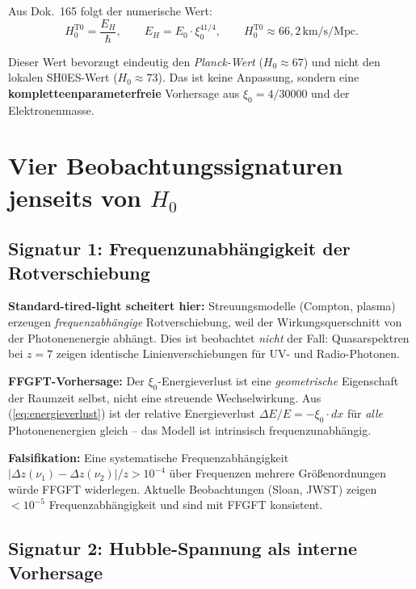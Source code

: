 Aus Dok.~165 folgt der numerische Wert:
\begin{equation}
  H_0^{\text{T0}}
  = \frac{E_H}{\hbar},
  \qquad
  E_H = E_0 \cdot \xi_0^{41/4},
  \qquad
  H_0^{\text{T0}} \approx 66{,}2\,\text{km/s/Mpc}.
\end{equation}

Dieser Wert bevorzugt eindeutig den \emph{Planck-Wert} ($H_0 \approx
67$) und nicht den lokalen SH0ES-Wert ($H_0 \approx 73$). Das ist
keine Anpassung, sondern eine \textbf{kompletteenparameterfreie}
Vorhersage aus $\xi_0 = 4/30000$ und der Elektronenmasse.

\section{\texorpdfstring{Vier Beobachtungssignaturen jenseits von $H_0$}{Vier Beobachtungssignaturen jenseits von H_0}}

\subsection{Signatur 1: Frequenzunabhängigkeit der Rotverschiebung}

\textbf{Standard-tired-light scheitert hier:} Streuungsmodelle
(Compton, plasma) erzeugen \emph{frequenzabhängige} Rotverschiebung,
weil der Wirkungsquerschnitt von der Photonenenergie abhängt. Dies ist
beobachtet \emph{nicht} der Fall: Quasarspektren bei $z = 7$ zeigen
identische Linienverschiebungen für UV- und Radio-Photonen.

\textbf{FFGFT-Vorhersage:} Der $\xi_0$-Energieverlust ist eine
\emph{geometrische} Eigenschaft der Raumzeit selbst, nicht eine
streuende Wechselwirkung. Aus (\ref{eq:energieverlust}) ist der
relative Energieverlust $\Delta E/E = -\xi_0 \cdot dx$ für \emph{alle}
Photonenenergien gleich -- das Modell ist intrinsisch frequenzunabhängig.

\textbf{Falsifikation:} Eine systematische Frequenzabhängigkeit
$|\Delta z(\nu_1) - \Delta z(\nu_2)| / z > 10^{-4}$ über Frequenzen
mehrere Größenordnungen würde FFGFT widerlegen. Aktuelle
Beobachtungen (Sloan, JWST) zeigen $< 10^{-5}$ Frequenzabhängigkeit
und sind mit FFGFT konsistent.

\subsection{Signatur 2: Hubble-Spannung als interne Vorhersage}

